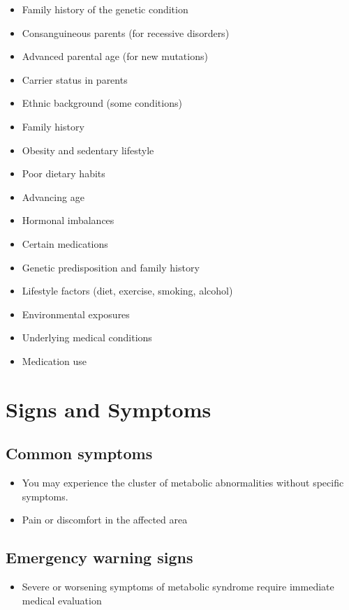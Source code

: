 \begin{itemize}[noitemsep]
  \item Family history of the genetic condition
  \item Consanguineous parents (for recessive disorders)
  \item Advanced parental age (for new mutations)
  \item Carrier status in parents
  \item Ethnic background (some conditions)
  \item Family history
  \item Obesity and sedentary lifestyle
  \item Poor dietary habits
  \item Advancing age
  \item Hormonal imbalances
  \item Certain medications
  \item Genetic predisposition and family history
  \item Lifestyle factors (diet, exercise, smoking, alcohol)
  \item Environmental exposures
  \item Underlying medical conditions
  \item Medication use
\end{itemize}
\section{Signs and Symptoms}

\subsection{Common symptoms}
\begin{itemize}[noitemsep]
  \item You may experience the cluster of metabolic abnormalities without specific symptoms.

  \item Pain or discomfort in the affected area
  \end{itemize}

\subsection{Emergency warning signs}
\begin{itemize}[noitemsep]
  \item Severe or worsening symptoms of metabolic syndrome require immediate medical evaluation
\end{itemize}
